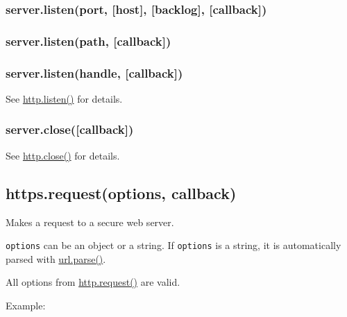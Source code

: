 \subsubsection{server.listen(port, {[}host{]}, {[}backlog{]},
{[}callback{]})}\label{server.listenport-host-backlog-callback}

\subsubsection{server.listen(path,
{[}callback{]})}\label{server.listenpath-callback}

\subsubsection{server.listen(handle,
{[}callback{]})}\label{server.listenhandle-callback}

See
\href{http.html\#http_server_listen_port_hostname_backlog_callback}{http.listen()}
for details.

\subsubsection{server.close({[}callback{]})}\label{server.closecallback}

See \href{http.html\#http_server_close_callback}{http.close()} for
details.

\subsection{https.request(options,
callback)}\label{https.requestoptions-callback}

Makes a request to a secure web server.

\texttt{options} can be an object or a string. If \texttt{options} is a
string, it is automatically parsed with
\href{url.html\#url.parse}{url.parse()}.

All options from
\href{http.html\#http_http_request_options_callback}{http.request()} are
valid.

Example:

